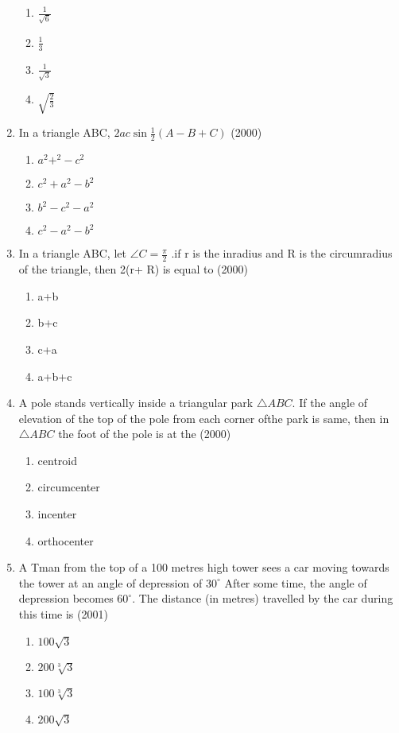 \documentclass[12pt]{article}
\begin{document}
\begin{enumerate}
\begin{enumerate}
\item $\frac{1}{\sqrt{6}}$
\item $\frac{1}{3}$
\item $\frac{1}{\sqrt{3}}$
\item $\sqrt{\frac{2}{3}}$
\end{enumerate}
\item  In a triangle ABC, $2ac\sin\frac{1}{2}(A-B+C)$ (2000)
\begin{enumerate}
\item $a^2+^2-c^2$
\item $c^2+a^2-b^2$
\item $b^2-c^2-a^2$
\item $c^2-a^2-b^2$
\end{enumerate}
\item  In a triangle ABC, let $\angle C=\frac{\pi}{2}$ .if r is the inradius and R is the circumradius of the triangle, then 2(r+ R) is equal to (2000)
\begin{enumerate}
\item a+b
\item b+c
\item c+a
\item a+b+c
\end{enumerate}
\item A pole stands vertically inside a triangular park $\triangle ABC$. If the angle of elevation of the top of the pole from each corner ofthe park is same, then in $\triangle ABC$ the foot of the pole is at the (2000)
\begin{enumerate}
\item centroid
\item circumcenter
\item incenter
\item orthocenter
\end{enumerate}
\item A Tman from the top of a 100 metres high tower sees a car moving towards the tower at an angle of depression of $30^\circ$ After some time, the angle of depression becomes $60^\circ$. The distance (in metres) travelled by the car during this time is (2001)
\begin{enumerate}
\item $100\sqrt{3}$
\item $200\sqrt[3]{3}$
\item $100\sqrt[3]{3}$
\item $200\sqrt{3}$
\end{enumerate}

\end{enumerate}
\end{document}
